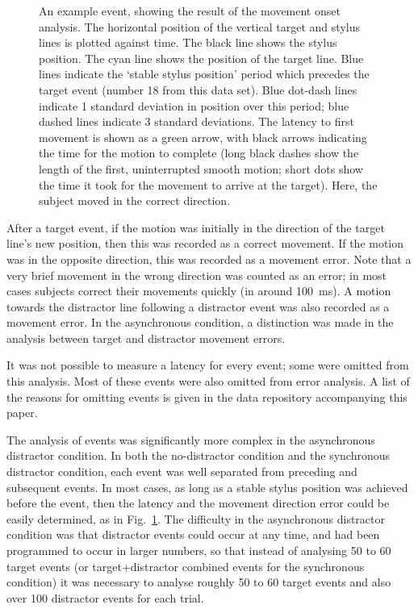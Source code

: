 \documentclass[10pt,letterpaper]{article}
\begin{document}
\begin{figure}[htb!]
\centering
\caption[Obtaining the latency, method 1] {An example event, showing
  the result of the movement onset analysis. The horizontal position
  of the vertical target and stylus lines is plotted against time. The
  black line shows the stylus position. The cyan line shows the
  position of the target line. Blue lines indicate the `stable stylus
  position' period which precedes the target event (number 18 from
  this data set). Blue dot-dash lines indicate 1 standard deviation in
  position over this period; blue dashed lines indicate 3 standard
  deviations. The latency to first movement is shown as a green arrow,
  with black arrows indicating the time for the motion to complete
  (long black dashes show the length of the first, uninterrupted
  smooth motion; short dots show the time it took for the movement to
  arrive at the target). Here, the subject moved in the correct
  direction.}
\label{example_event}
\end{figure}

After a target event, if the motion was initially in the direction of
the target line's new position, then this was recorded as a correct
movement. If the motion was in the opposite direction, this was
recorded as a movement error. Note that a very brief movement in the
wrong direction was counted as an error; in most cases subjects
correct their movements quickly (in around 100~ms). A motion towards
the distractor line following a distractor event was also recorded as
a movement error. In the asynchronous condition, a distinction was
made in the analysis between target and distractor movement errors.

It was not possible to measure a latency for every event; some were
omitted from this analysis. Most of these events were also omitted
from error analysis.
A list of the reasons for omitting events is given in the data
repository accompanying this paper.


The analysis of events was significantly more complex in the
asynchronous distractor condition. In both the no-distractor condition
and the synchronous distractor condition, each event was well
separated from preceding and subsequent events. In most cases, as long
as a stable stylus position was achieved before the event, then the
latency and the movement direction error could be easily determined,
as in Fig.~\ref{example_event}. The difficulty in the asynchronous
distractor condition was that distractor events could occur at any
time, and had been programmed to occur in larger numbers, so that
instead of analysing 50 to 60 target events (or target+distractor
combined events for the synchronous condition) it was necessary to
analyse roughly 50 to 60 target events and also over 100 distractor
events for each trial.
\end{document}
